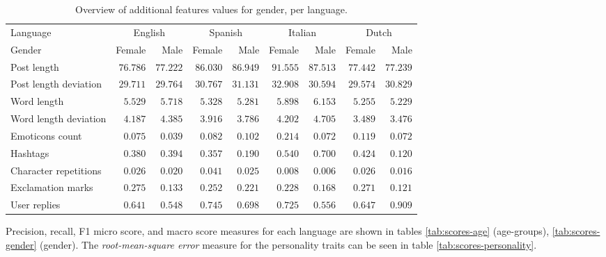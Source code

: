 \documentclass[10pt, a4paper]{article}
\begin{document}
\begin{table*}
\caption{Overview of additional features values for gender, per language.}
\label{tab:additionalfeatures-gender}
\begin{center}
\begin{tabular}{l|rr|rr|rr|rr}
\toprule
Language & \multicolumn{2}{|c|}{English} & \multicolumn{2}{|c}{Spanish} & \multicolumn{2}{|c}{Italian} & \multicolumn{2}{|c}{Dutch} \\
Gender & Female & Male & Female & Male & Female & Male & Female & Male \\
\midrule
Post length & $ 76.786 $ & $ 77.222 $ & $ 86.030 $ & $ 86.949 $ & $ 91.555 $ & $ 87.513 $ & $ 77.442 $ & $ 77.239 $ \\
Post length deviation & $ 29.711 $ & $ 29.764 $ & $ 30.767 $ & $ 31.131 $ & $ 32.908 $ & $ 30.594 $ & $ 29.574 $ & $ 30.829 $ \\
Word length & $ 5.529 $ & $ 5.718 $ & $ 5.328 $ & $ 5.281 $ & $ 5.898 $ & $ 6.153 $ & $ 5.255 $ & $ 5.229 $ \\
Word length deviation & $ 4.187 $ & $ 4.385 $ & $ 3.916 $ & $ 3.786 $ & $ 4.202 $ & $ 4.705 $ & $ 3.489 $ & $ 3.476 $ \\
Emoticons count & $ 0.075 $ & $ 0.039 $ & $ 0.082 $ & $ 0.102 $ & $ 0.214 $ & $ 0.072 $ & $ 0.119 $ & $ 0.072 $ \\
Hashtags &  $ 0.380 $ & $ 0.394 $ & $ 0.357 $ & $ 0.190 $ & $ 0.540 $ & $ 0.700 $ & $ 0.424 $ & $ 0.120 $ \\
Character repetitions & $ 0.026 $ & $ 0.020 $ & $ 0.041 $ & $ 0.025 $ & $ 0.008 $ & $ 0.006 $ & $ 0.026 $ & $ 0.016 $ \\
Exclamation marks & $ 0.275 $ & $ 0.133 $ & $ 0.252 $ & $ 0.221 $ & $ 0.228 $ & $ 0.168 $ & $ 0.271 $ & $ 0.121 $ \\
User replies & $ 0.641 $ & $ 0.548 $ & $ 0.745 $ & $ 0.698 $ & $ 0.725 $ & $ 0.556 $ & $ 0.647 $ & $ 0.909 $ \\
\bottomrule
\end{tabular}
\end{center}
\end{table*}

Precision, recall, F1 micro score, and macro score measures for each language are shown in tables \ref{tab:scores-age} (age-groups), \ref{tab:scores-gender} (gender).
The \textit{root-mean-square error} measure for the personality traits can be seen in table \ref{tab:scores-personality}.
\end{document}
